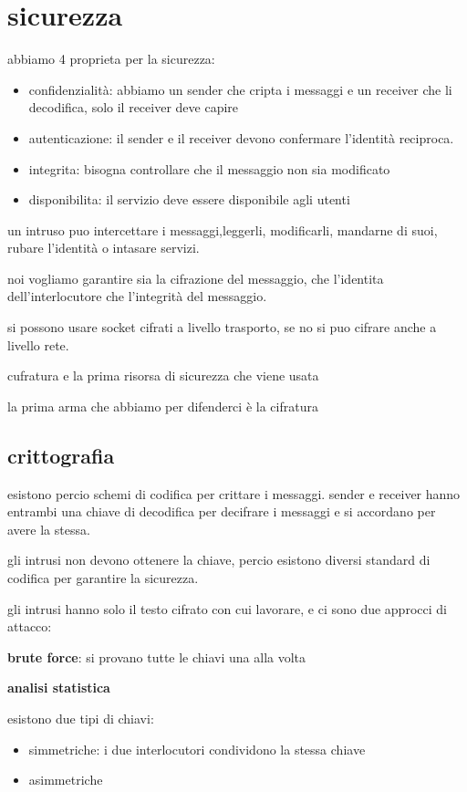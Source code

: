 \documentclass[12pt]{article}
\begin{document}
\section{sicurezza}

abbiamo 4 proprieta per la sicurezza:
\begin{itemize}
\item confidenzialità: abbiamo un sender che cripta i messaggi e un receiver che li decodifica, solo il receiver deve capire
\item autenticazione: il sender e il receiver devono confermare l'identità reciproca.
\item integrita: bisogna controllare che il messaggio non sia modificato
\item disponibilita: il servizio deve essere disponibile agli utenti
\end{itemize}


un intruso puo intercettare i messaggi,leggerli,  modificarli, mandarne di suoi, rubare l'identità o intasare servizi.

noi vogliamo garantire sia la cifrazione del messaggio, che l'identita dell'interlocutore che l'integrità del messaggio.

si possono usare socket cifrati a livello trasporto, se no si puo cifrare anche a livello rete.

cufratura e la prima risorsa di sicurezza che viene usata

la prima arma che abbiamo per difenderci è la cifratura

\subsection{crittografia}

esistono percio schemi di codifica per crittare i messaggi.
sender e receiver hanno entrambi una chiave di decodifica per decifrare i messaggi e si accordano per avere la stessa.

gli intrusi non devono ottenere la chiave, percio esistono diversi standard di codifica per garantire la sicurezza.

gli intrusi hanno solo il testo cifrato con cui lavorare, e ci sono due approcci di attacco:

    \textbf{brute force}: si provano tutte le chiavi una alla volta

    \textbf{analisi statistica}

    esistono due tipi di chiavi:
    \begin{itemize}
    \item simmetriche: i due interlocutori condividono la stessa chiave
    \item asimmetriche
    \end{itemize}
\end{document}
